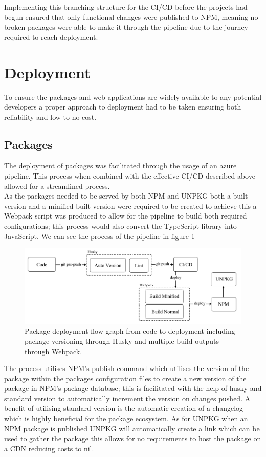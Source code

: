 \documentclass{l4proj}
\begin{document}
Implementing this branching structure for the CI/CD before the projects had begun ensured that only functional changes were published to NPM, meaning no broken packages were able to make it through the pipeline due to the journey required to reach deployment.

\section{Deployment}
To ensure the packages and web applications are widely available to any potential developers a proper approach to deployment had to be taken ensuring both reliability and low to no cost.

\subsection{Packages}
The deployment of packages was facilitated through the usage of an azure pipeline. This process when combined with the effective CI/CD described above allowed for a streamlined process.
\\ 
As the packages needed to be served by both NPM and UNPKG both a built version and a minified built version were required to be created to achieve this a Webpack script was produced to allow for the pipeline to build both required configurations; this process would also convert the TypeScript library into JavaScript. We can see the process of the pipeline in figure \ref{fig:deployment}

\begin{figure}[H]
    \begin{center}
    \includegraphics[width=12cm]{dissertation/images/Deployment.png}
    \end{center}
    \caption{Package deployment flow graph from code to deployment including package versioning through Husky and multiple build outputs through Webpack.}
    \label{fig:deployment}
\end{figure}

The process utilises NPM's publish command which utilises the version of the package within the packages configuration files to create a new version of the package in NPM's package database; this is facilitated with the help of husky and standard version to automatically increment the version on changes pushed. A benefit of utilising standard version is the automatic creation of a changelog which is highly beneficial for the package ecosystem. As for UNPKG when an NPM package is published UNPKG will automatically create a link which can be used to gather the package this allows for no requirements to host the package on a CDN reducing costs to nil.
\end{document}
